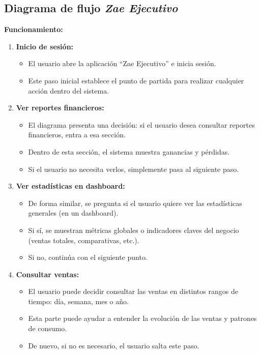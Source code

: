 \documentclass[protocolo.tex]{subfiles}
\begin{document}
\subsection{Diagrama de flujo \textit{Zae Ejecutivo}}
\textbf{Funcionamiento:}
\begin{enumerate}
    \item \textbf{Inicio de sesión: }  
    \begin{itemize}
        \item El usuario abre la aplicación “Zae Ejecutivo” e inicia sesión.
        \item Este paso inicial establece el punto de partida para realizar cualquier acción dentro del sistema.
        
    \end{itemize}
    \item \textbf{Ver reportes financieros:}  
    \begin{itemize}
        \item El diagrama presenta una decisión: si el usuario desea consultar reportes financieros, entra a esa sección.
        \item Dentro de esta sección, el sistema muestra ganancias y pérdidas.
        \item Si el usuario no necesita verlos, simplemente pasa al siguiente paso.
        
    \end{itemize}
    \item \textbf{Ver estadísticas en dashboard:}  
    \begin{itemize}
        \item De forma similar, se pregunta si el usuario quiere ver las estadísticas generales (en un dashboard).
        \item Si sí, se muestran métricas globales o indicadores claves del negocio (ventas totales, comparativas, etc.).
        \item Si no, continúa con el siguiente punto.
        
    \end{itemize}
    \item \textbf{Consultar ventas:} 
    \begin{itemize}
        \item El usuario puede decidir consultar las ventas en distintos rangos de tiempo: día, semana, mes o año.
        \item Esta parte puede ayudar a entender la evolución de las ventas y patrones de consumo.
        \item De nuevo, si no es necesario, el usuario salta este paso.
        

\end{itemize}
\end{enumerate}
\end{document}
